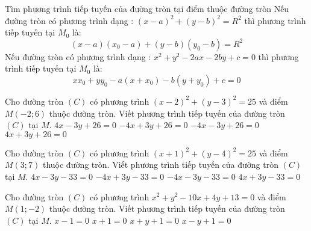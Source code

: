 \begin{dang}{Tìm phương trình tiếp tuyến của đường tròn tại điểm  thuộc đường tròn}
	Nếu đường tròn có phương trình dạng : $(x-a)^2+(y-b)^2=R^2$ thì phương trình tiếp tuyến tại $M_0$ là:
	$$(x-a)(x_0-a)+(y-b)(y_0-b)=R^2$$
	Nếu đường tròn có phương trình dạng : $x^2+y^2-2ax-2by+c=0$ thì phương trình tiếp tuyến tại $M_0$ là:
	$$xx_0+yy_0-a(x+x_0)-b(y+y_0)+c=0$$
\end{dang}
\begin{vd}%
	Cho đường tròn $(C)$ có phương trình $(x-2)^2+(y-3)^2=25$ và điểm $M(-2;6)$ thuộc đường tròn. 
	Viết phương trình tiếp tuyến của đường tròn $(C)$ tại $M$.
\choice
{\True $4x-3y+26=0$}
{$-4x+3y+26=0$}
{$-4x-3y+26=0$}
{$4x+3y+26=0$}
\end{vd}
\begin{vd}%
	Cho đường tròn $(C)$ có phương trình $(x+1)^2+(y-4)^2=25$ và điểm $M(3;7)$ thuộc đường tròn. 
	Viết phương trình tiếp tuyến của đường tròn $(C)$ tại $M$.
\choice
{\True $4x-3y-33=0$}
{$-4x+3y-33=0$}
{$-4x-3y-33=0$}
{$4x+3y-33=0$}
\end{vd}
\begin{vd}%
	Cho đường tròn $(C)$ có phương trình $x^2+y^2-10x+4y+13=0$ và điểm $M(1;-2)$ thuộc đường tròn. 
	Viết phương trình tiếp tuyến của đường tròn $(C)$ tại $M$.
\choice
{\True $x-1=0$}
{$x+1=0$}
{$x+y+1=0$}
{$x-y+1=0$}
\end{vd}
